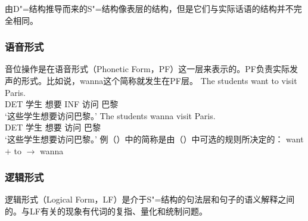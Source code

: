 由D"=结构推导而来的S"=结构像表层的结构，但是它们与实际话语的结构并不完全相同。

\subsubsection{语音形式}

音位操作是在语音形式（Phonetic Form，PF）这一层来表示的。PF负责实际发声的形式。比如说，wanna这个简称就发生在PF层\citep[--21]{Chomsky81a}。
\eal
\ex 
\gll The students want to visit Paris.\\
DET 学生 想要 INF 访问 巴黎\\
\glt `这些学生想要访问巴黎。'
\ex 
\gll The students wanna visit Paris.\\
DET 学生 想要 访问 巴黎\\
\glt `这些学生想要访问巴黎。'
\zl
例（）中的简称是由（）中可选的规则所决定的：
\ea
want $+$ to $\to$ wanna
\z
{}

\subsubsection{逻辑形式}

逻辑形式（Logical Form，LF）是介于S"=结构的句法层和句子的语义解释之间的。与LF有关的现象有代词的复指、量化和统制问题。

